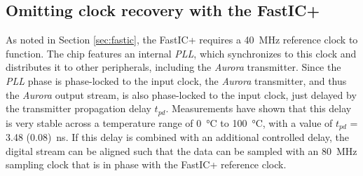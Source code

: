 \subsection{Omitting clock recovery with the FastIC+}
As noted in Section \ref{sec:fastic}, the FastIC+ requires a \SI{40}{\mega\hertz} reference clock to function. The chip features an internal \emph{PLL}, which synchronizes to this clock and distributes it to other peripherals, including the \emph{Aurora} transmitter. Since the \emph{PLL} phase is phase-locked to the input clock, the \emph{Aurora} transmitter, and thus the \emph{Aurora} output stream, is also phase-locked to the input clock, just delayed by the transmitter propagation delay $t_{pd}$. \cite{ficDatasheet} Measurements have shown that this delay is very stable across a temperature range of \SI{0}{\celsius} to \SI{100}{\celsius}, with a value of $t_{pd}$ = \SI{3.48 (0.08)}{\nano\second}. If this delay is combined with an additional controlled delay, the digital stream can be aligned such that the data can be sampled with an \SI{80}{\mega\hertz} sampling clock that is in phase with the FastIC+ reference clock.

